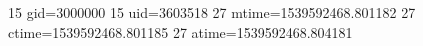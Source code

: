 15 gid=3000000
15 uid=3603518
27 mtime=1539592468.801182
27 ctime=1539592468.801185
27 atime=1539592468.804181
